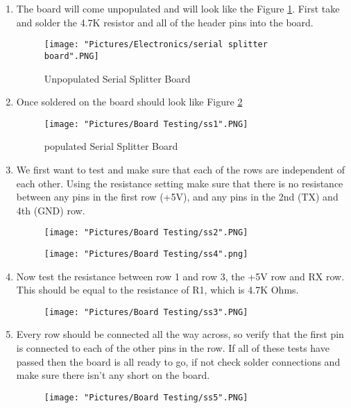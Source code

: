 \documentclass[12pt]{article}
\begin{document}
\begin{enumerate}
	\item The board will come unpopulated and will look like the Figure \ref{ss}. First take and solder the 4.7K resistor and all of the header pins into 		the board. 

	\begin{figure}[H]
	  	\centering
	    	\texttt{[image: "Pictures/Electronics/serial splitter board".PNG]}
		\caption{Unpopulated Serial Splitter Board}
		\label{ss}
	\end{figure}

	\item Once soldered on the board should look like Figure \ref{ss1}

	\begin{figure}[H]
	  	\centering
	    	\texttt{[image: "Pictures/Board Testing/ss1".PNG]}
		\caption{populated Serial Splitter Board}
		\label{ss1}
	\end{figure}

	\item We first want to test and make sure that each of the rows are independent of each other. Using the resistance setting make sure that there is 		no resistance between any pins in the first row (+5V), and any pins in the 2nd (TX) and 4th (GND) row. 

	\begin{figure}[H]
	 	\centering
	  	\begin{minipage}[b]{0.45\textwidth}
			\texttt{[image: "Pictures/Board Testing/ss2".PNG]}
	  	\end{minipage}
	  	\hfill
	  	\begin{minipage}[b]{0.45\textwidth}
	    		\texttt{[image: "Pictures/Board Testing/ss4".png]}
	  	\end{minipage}
		\label{sstest1}
	\end{figure}

	\item Now test the resistance between row 1 and row 3, the +5V row and RX row. This should be equal to the resistance of R1, which is 4.7K 			Ohms. 

	\begin{figure}[H]
	  	\centering
	    	\texttt{[image: "Pictures/Board Testing/ss3".PNG]}
		\label{ss3}
	\end{figure}
	
	\item Every row should be connected all the way across, so verify that the first pin is connected to each of the other pins in the row. If all of these 		tests have passed then the board is all ready to go, if not check solder connections and make sure there isn't any short on the board. 

	\begin{figure}[H]
	  	\centering
	    	\texttt{[image: "Pictures/Board Testing/ss5".PNG]}
		\label{ss5}
	\end{figure}

\end{enumerate}
\end{document}
